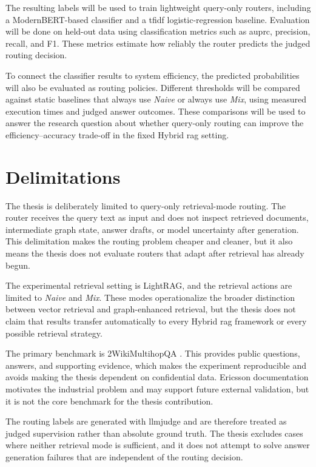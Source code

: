 \documentclass[english, bibtex]{kththesis}               %
\numberwithin{listing}{chapter}
\begin{document}
The resulting labels will be used to train lightweight query-only routers, including a ModernBERT-based classifier and a \gls{tfidf} logistic-regression baseline. Evaluation will be done on held-out data using classification metrics such as \gls{auprc}, precision, recall, and F1. These metrics estimate how reliably the router predicts the judged routing decision.

To connect the classifier results to system efficiency, the predicted probabilities will also be evaluated as routing policies. Different thresholds will be compared against static baselines that always use \emph{Naive} or always use \emph{Mix}, using measured execution times and judged answer outcomes. These comparisons will be used to answer the research question about whether query-only routing can improve the efficiency--accuracy trade-off in the fixed Hybrid \gls{rag} setting.

\section{Delimitations}
\label{sec:delimitations}

The thesis is deliberately limited to query-only retrieval-mode routing. The router receives the query text as input and does not inspect retrieved documents, intermediate graph state, answer drafts, or model uncertainty after generation. This delimitation makes the routing problem cheaper and cleaner, but it also means the thesis does not evaluate routers that adapt after retrieval has already begun.

The experimental retrieval setting is LightRAG, and the retrieval actions are limited to \emph{Naive} and \emph{Mix}. These modes operationalize the broader distinction between vector retrieval and graph-enhanced retrieval, but the thesis does not claim that results transfer automatically to every Hybrid \gls{rag} framework or every possible retrieval strategy.

The primary benchmark is 2WikiMultihopQA \cite{ho2020twowiki}. This provides public questions, answers, and supporting evidence, which makes the experiment reproducible and avoids making the thesis dependent on confidential data. Ericsson documentation motivates the industrial problem and may support future external validation, but it is not the core benchmark for the thesis contribution.

The routing labels are generated with \gls{llmjudge} and are therefore treated as judged supervision rather than absolute ground truth. The thesis excludes cases where neither retrieval mode is sufficient, and it does not attempt to solve answer generation failures that are independent of the routing decision.
\end{document}
